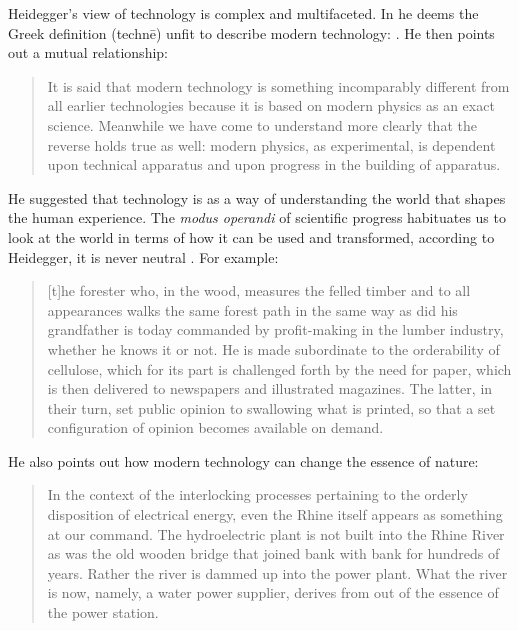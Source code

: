 Heidegger's view of technology is complex and multifaceted. In  he deems the Greek definition (technē) unfit to describe modern technology: . He then points out a mutual relationship: \blockcquote[p. 14]{Heidegger1977}{It is said that modern technology is something incomparably different from all earlier technologies because it is based on modern physics as an exact science. Meanwhile we have come to understand more clearly that the reverse holds true as well: modern physics, as experimental, is dependent upon technical apparatus and upon progress in the building of apparatus.}

 He suggested that technology is as a way of understanding the world that shapes the human experience. The \emph{modus operandi} of scientific progress habituates us to look at the world in terms of how it can be used and transformed, according to Heidegger, it is never neutral \citep{Heidegger1977}. For example: \blockcquote[p. 18]{Heidegger1977}{[t]he forester who, in the wood, measures the felled timber and to all appearances walks the same forest path in the same way as did his grandfather is today commanded by profit-making in the lumber industry, whether he knows it or not. He is made subordinate to the orderability of cellulose, which for its part is challenged forth by the need for paper, which is then delivered to newspapers and illustrated magazines. The latter, in their turn, set public opinion to swallowing what is printed, so that a set configuration of opinion becomes available on demand.}
He also points out how modern technology can change the essence of nature: \blockcquote[p. 16]{Heidegger1977}{In the context of the interlocking processes pertaining to the orderly disposition of electrical energy, even the Rhine itself appears as something at our command. The hydroelectric plant is not built into the Rhine River as was the old wooden bridge that joined bank with bank for hundreds of years. Rather the river is dammed up into the power plant. What the river is now, namely, a water power supplier, derives from out of the essence of the power station.}

